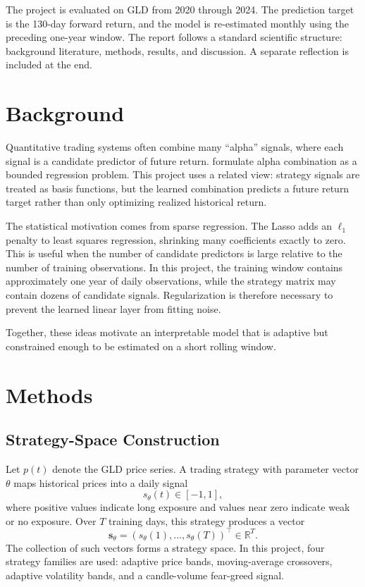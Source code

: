 \documentclass[11pt, letterpaper]{article}
\begin{document}
The project is evaluated on GLD from 2020 through 2024. The prediction target is the 130-day forward return, and the model is re-estimated monthly using the preceding one-year window. The report follows a standard scientific structure: background literature, methods, results, and discussion. A separate reflection is included at the end.

\section{Background}

Quantitative trading systems often combine many ``alpha'' signals, where each signal is a candidate predictor of future return. \citet{kakushadze2015} formulate alpha combination as a bounded regression problem. This project uses a related view: strategy signals are treated as basis functions, but the learned combination predicts a future return target rather than only optimizing realized historical return.

The statistical motivation comes from sparse regression. The Lasso \citep{tibshirani1996} adds an $\ell_1$ penalty to least squares regression, shrinking many coefficients exactly to zero. This is useful when the number of candidate predictors is large relative to the number of training observations. In this project, the training window contains approximately one year of daily observations, while the strategy matrix may contain dozens of candidate signals. Regularization is therefore necessary to prevent the learned linear layer from fitting noise.

Together, these ideas motivate an interpretable model that is adaptive but constrained enough to be estimated on a short rolling window.

\section{Methods}

\subsection{Strategy-Space Construction}

Let $p(t)$ denote the GLD price series. A trading strategy with parameter vector $\theta$ maps historical prices into a daily signal
\[
    s_{\theta}(t) \in [-1,1],
\]
where positive values indicate long exposure and values near zero indicate weak or no exposure. Over $T$ training days, this strategy produces a vector
\[
    \mathbf{s}_{\theta} = (s_{\theta}(1),\ldots,s_{\theta}(T))^\top \in \mathbb{R}^T.
\]
The collection of such vectors forms a strategy space. In this project, four strategy families are used: adaptive price bands, moving-average crossovers, adaptive volatility bands, and a candle-volume fear-greed signal.
\end{document}
